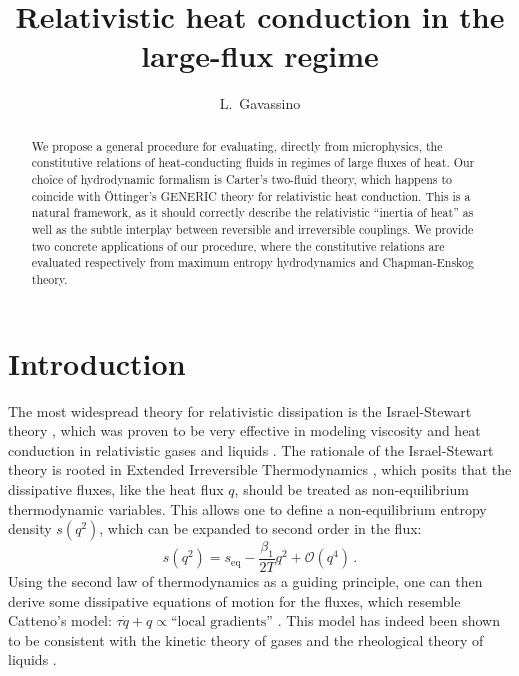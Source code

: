 \documentclass[a4paper, amsfonts, amssymb, amsmath, reprint, showkeys, nofootinbib, twoside, onecolumn, notitlepage]{revtex4-1}
\begin{document}
\title{Relativistic heat conduction in the large-flux regime}
\author{L.~Gavassino}


\begin{abstract}
We propose a general procedure for evaluating, directly from microphysics, the constitutive relations of heat-conducting fluids in regimes of large fluxes of heat. Our choice of hydrodynamic formalism is Carter's two-fluid theory, which happens to coincide with \"{O}ttinger's GENERIC theory for relativistic heat conduction. This is a natural framework, as it should correctly describe the relativistic ``inertia of heat'' as well as the subtle interplay between reversible and irreversible couplings. We provide two concrete applications of our procedure, where the constitutive relations are evaluated respectively from maximum entropy hydrodynamics and Chapman-Enskog theory.
\end{abstract} 

\maketitle

\section{Introduction}\label{intro}

The most widespread theory for relativistic dissipation is the Israel-Stewart theory \cite{Israel_Stewart_1979,Hishcock1983}, which was proven to be very effective in modeling viscosity and heat conduction in relativistic gases \cite{Denicol2012Boltzmann} and liquids \cite{GavassinoGENERIC2023}. The rationale of the Israel-Stewart theory is rooted in Extended Irreversible Thermodynamics \cite{Jou_Extended}, which posits that the dissipative fluxes, like the heat flux $q$, should be treated as non-equilibrium thermodynamic variables. This allows one to define a non-equilibrium entropy density $s(q^2)$, which can be expanded to second order in the flux:
\begin{equation}\label{suissius}
    s(q^2)=s_{\text{eq}}-\dfrac{\beta_1}{2T} q^2 +\mathcal{O}(q^4) \, .
\end{equation}
Using the second law of thermodynamics as a guiding principle, one can then derive some dissipative equations of motion for the fluxes, which resemble Catteno's model: $\tau \dot{q}+q \propto \text{``local gradients''}$ \cite{cattaneo1958}. This model has indeed been shown to be consistent with the kinetic theory of gases \cite{Denicol_Relaxation_2011,WagnerGavassino2023} and the rheological theory of liquids \cite{Frenkel_book,BAGGIOLI20201,GavassinoCarterGeneric2023}. 
\end{document}
